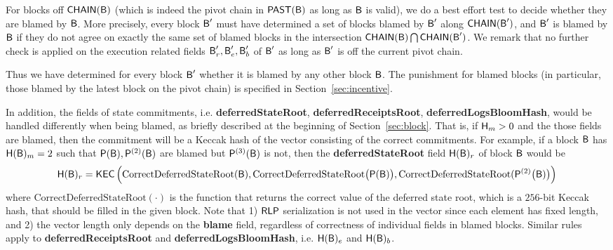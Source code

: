 	For blocks off $\mathsf{CHAIN}(\textsf{B})$ (which is indeed the pivot chain in $\mathsf{PAST}(\textsf{B})$ as long as $\textsf{B}$ is valid), 
	we do a best effort test to decide whether they are blamed by $\textsf{B}$.
	More precisely,
	every block $\textsf{B}'$ must have determined a set of blocks blamed by $\textsf{B}'$ along $\mathsf{CHAIN}(\textsf{B}')$,
	and $\textsf{B}'$ is blamed by $\textsf{B}$ if they do not agree on exactly the same set of blamed blocks in the intersection $\mathsf{CHAIN}(\textsf{B})\bigcap\mathsf{CHAIN}(\textsf{B}')$.
	We remark that no further check is applied on the execution related fields $\textsf{B}'_r,\textsf{B}'_e,\textsf{B}'_b$ of $\textsf{B}'$ as long as $\textsf{B}'$ is off the current pivot chain.

	Thus we have determined for every block $\textsf{B}'$ whether it is blamed by any other block $\textsf{B}$.
	The punishment for blamed blocks (in particular, those blamed by the latest block on the pivot chain) is specified in Section~\ref{sec:incentive}.

	In addition, the fields of state commitments, i.e. {\bf deferredStateRoot}, {\bf deferredReceiptsRoot}, {\bf deferredLogsBloomHash}, 
	would be handled differently when being blamed, as briefly described at the beginning of Section~\ref{sec:block}.
	That is, if $\textsf{H}_m>0$ and the those fields are blamed, 
	then the commitment will be a Keccak hash of the vector consisting of the correct commitments.
	For example, if a block $\textsf{B}$ has $\textsf{H}(\textsf{B})_m=2$ such that $\mathsf{P}(\textsf{B}),\mathsf{P}^{(2)}(\textsf{B})$ are blamed but $\mathsf{P}^{(3)}(\textsf{B})$ is not, then the {\bf deferredStateRoot} field 
	$\textsf{H}(\textsf{B})_r$ of block $\textsf{B}$
	would be 
	\begin{align}
		\textsf{H}(\textsf{B})_r = \mathsf{KEC}\left( \mathrm{CorrectDeferredStateRoot}(\textsf{B}), \mathrm{CorrectDeferredStateRoot}\big(\mathsf{P}(\textsf{B})\big), \mathrm{CorrectDeferredStateRoot}(\mathsf{P}^{(2)}\big(\textsf{B})\big) \right)
	\end{align}
	where $\mathrm{CorrectDeferredStateRoot}(\cdot)$ is the function that returns the correct value of the deferred state root, 
	which is a $256$-bit Keccak hash, that should be filled in the given block.
	Note that 1) $\mathsf{RLP}$ serialization is not used in the vector since each element has fixed length,
	and 2) the vector length only depends on the {\bf blame} field, regardless of correctness of individual fields in  blamed blocks.
	Similar rules apply to  {\bf deferredReceiptsRoot} and {\bf deferredLogsBloomHash}, i.e. $\textsf{H}(\textsf{B})_e$ and $\textsf{H}(\textsf{B})_b$.

